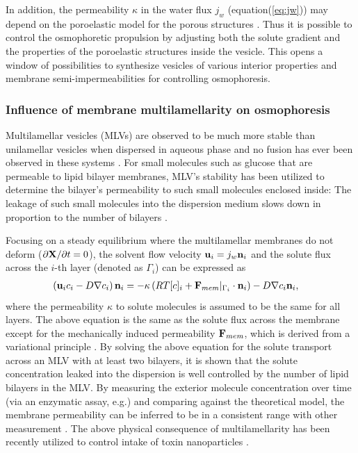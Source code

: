 \documentclass[11pt]{article}
\begin{document}
In addition, the permeability $\kappa$ in the water flux $j_w$ (equation(\ref{eq:jw})) may depend on the poroelastic model for the porous structures \cite{MacMinn2016_PRApplied}. 
Thus it is possible to control the osmophoretic propulsion by adjusting both the solute gradient and 
 the  properties of the poroelastic structures inside the vesicle. This opens a window of possibilities to synthesize vesicles of various interior properties and 
 membrane semi-impermeabilities for controlling osmophoresis.



\subsubsection{Influence of membrane multilamellarity on osmophoresis \label{subsubsec:Influence_membrane_multilamellarity}}
Multilamellar vesicles (MLVs) are observed to be much more stable than unilamellar vesicles when dispersed in aqueous phase 
and no fusion has ever been observed in these systems \cite{Lasic1988_BiochemJ}.
For small molecules such as glucose that are permeable to lipid bilayer membranes,
MLV's stability has been utilized to determine the bilayer's permeability to such small molecules enclosed inside:
The leakage of such small molecules into the dispersion medium slows down in proportion to the number of bilayers  \cite{Faure2006_BJ}.

Focusing on a steady equilibrium where the multilamellar membranes do not deform ($\partial {\bf X}/\partial t=0$), 
the solvent flow velocity ${\bf u}_i = j_w {\bf n}_i$ and the solute flux across the $i$-th layer (denoted as $\Gamma_i$) can be expressed as
\begin{align}
\label{eq:solute_flux}
\left({\bf u}_i c_i - D\nabla c_i\right){\bf n}_i &= -\kappa \left(RT[c]_i + {\bf F}_{mem}\rvert_{\Gamma_i}\cdot{\bf n}_i\right)-D\nabla c_i {\bf n}_i,
\end{align}
where the permeability $\kappa$ to solute molecules is assumed to be the same for all layers. The above equation is the same as the solute flux across the membrane
except for the mechanically induced permeability ${\bf F}_{mem}$, which is derived from a variational principle \cite{YaoMori2017_JCP}.
By solving the above equation for the solute transport across an MLV with at least two bilayers, it is shown that the solute concentration leaked into the dispersion
 is well controlled by the number of lipid bilayers in the MLV. 
 By measuring the exterior molecule concentration over time (via an enzymatic assay, e.g.) and comparing against the theoretical model,
the membrane permeability can be inferred to be in a consistent range with other measurement \cite{Faure2006_BJ}.
The above physical consequence of multilamellarity has been recently utilized to control intake of toxin nanoparticles \cite{Kerdudo2014_FoodChem}.
\end{document}
